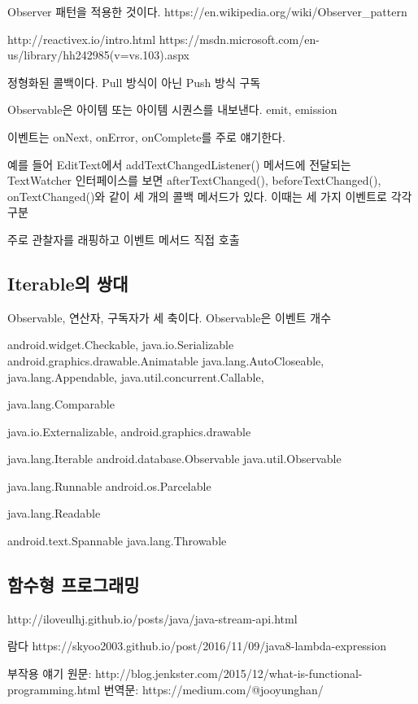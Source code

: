 \documentclass{book}
\begin{document}
Observer 패턴을 적용한 것이다.
https://en.wikipedia.org/wiki/Observer_pattern

http://reactivex.io/intro.html
https://msdn.microsoft.com/en-us/library/hh242985(v=vs.103).aspx

정형화된 콜백이다.
Pull 방식이 아닌 Push 방식 구독

Observable은 아이템 또는 아이템 시퀀스를 내보낸다.
emit, emission

이벤트는 onNext, onError, onComplete를 주로 얘기한다.

예를 들어 EditText에서 addTextChangedListener() 메서드에 전달되는 TextWatcher 인터페이스를 보면 afterTextChanged(), beforeTextChanged(), onTextChanged()와 같이 세 개의 콜백 메서드가 있다. 이때는 세 가지 이벤트로 각각 구분

주로 관찰자를 래핑하고 이벤트 메서드 직접 호출
\subsection{Iterable의 쌍대}

Observable, 연산자, 구독자가 세 축이다.
Observable은 이벤트 개수



android.widget.Checkable, java.io.Serializable
android.graphics.drawable.Animatable
java.lang.AutoCloseable, java.lang.Appendable, 
java.util.concurrent.Callable,

java.lang.Comparable

java.io.Externalizable, 
android.graphics.drawable

java.lang.Iterable
	android.database.Observable
		java.util.Observable
		
java.lang.Runnable
android.os.Parcelable

java.lang.Readable

android.text.Spannable
	java.lang.Throwable

\subsection{함수형 프로그래밍}
http://iloveulhj.github.io/posts/java/java-stream-api.html

람다
https://skyoo2003.github.io/post/2016/11/09/java8-lambda-expression

부작용 얘기
원문: http://blog.jenkster.com/2015/12/what-is-functional-programming.html
번역문: 
https://medium.com/@jooyunghan/%
\end{document}
